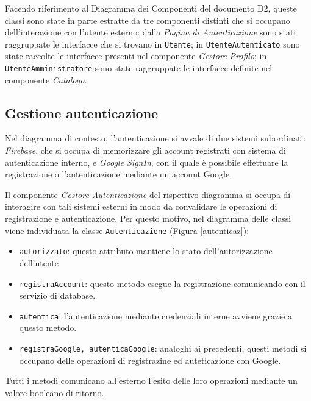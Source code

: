 \documentclass[11pt, a4paper]{article}
\theoremstyle{definition} %
\begin{document}
Facendo riferimento al Diagramma dei Componenti del
documento D2, queste classi sono state in parte estratte da tre componenti
distinti che si occupano dell'interazione con l'utente esterno: dalla
\textit{Pagina di Autenticazione} sono stati raggruppate le interfacce che
si trovano in \texttt{Utente}; in \texttt{UtenteAutenticato} sono state
raccolte le interfacce presenti nel componente \textit{Gestore Profilo};
in \texttt{UtenteAmministratore} sono state raggruppate le interfacce
definite nel componente \textit{Catalogo}.


\newpage
\subsection{Gestione autenticazione}
Nel diagramma di contesto, l'autenticazione si avvale di due sistemi
subordinati: \textit{Firebase}, che si occupa di memorizzare gli account
registrati con sistema di autenticazione interno, e \textit{Google SignIn},
con il quale è possibile effettuare la registrazione o l'autenticazione
mediante un account Google.

Il componente \textit{Gestore Autenticazione} del rispettivo diagramma si
occupa di interagire con tali sistemi esterni in modo da convalidare le
operazioni di registrazione e autenticazione. Per questo motivo, nel diagramma
delle classi viene individuata la classe \texttt{Autenticazione} (Figura \ref{autenticaz}):
\begin{itemize}
    \item \texttt{autorizzato}: questo attributo mantiene lo stato dell'autorizzazione
    dell'utente

    \item \texttt{registraAccount}: questo metodo esegue la registrazione
    comunicando con il servizio di database.
    \item \texttt{autentica}: l'autenticazione mediante credenziali interne
    avviene grazie a questo metodo.
    \item \texttt{registraGoogle, autenticaGoogle}: analoghi ai precedenti,
    questi metodi si occupano delle operazioni di registrazine ed auteticazione
    con Google.
\end{itemize}
Tutti i metodi comunicano all'esterno l'esito delle loro operazioni mediante
un valore booleano di ritorno.
\end{document}

